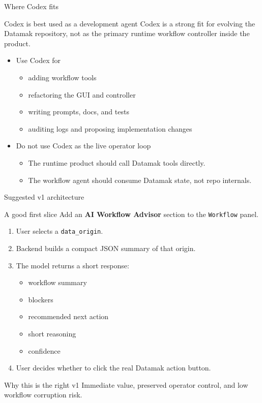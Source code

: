 \documentclass[aspectratio=169,11pt]{beamer}
\newcommand{\code}[1]{\texttt{#1}}
\newcommand{\good}[1]{\textcolor{ppplGreen}{#1}}
\newcommand{\warn}[1]{\textcolor{ppplOrange}{#1}}
\begin{document}
\begin{frame}{Where Codex fits}
  \begin{block}{Codex is best used as a development agent}
    Codex is a strong fit for evolving the Datamak repository, not as the
    primary runtime workflow controller inside the product.
  \end{block}

  \begin{itemize}
    \item \good{Use Codex for}
    \begin{itemize}
      \item adding workflow tools
      \item refactoring the GUI and controller
      \item writing prompts, docs, and tests
      \item auditing logs and proposing implementation changes
    \end{itemize}
    \item \warn{Do not use Codex as the live operator loop}
    \begin{itemize}
      \item The runtime product should call Datamak tools directly.
      \item The workflow agent should consume Datamak state, not repo internals.
    \end{itemize}
  \end{itemize}
\end{frame}

\begin{frame}{Suggested v1 architecture}
  \begin{block}{A good first slice}
    Add an \textbf{AI Workflow Advisor} section to the \code{Workflow} panel.
  \end{block}

  \begin{enumerate}\footnotesize
    \item User selects a \code{data\_origin}.
    \item Backend builds a compact JSON summary of that origin.
    \item The model returns a short response:
    \begin{itemize}\itemsep2pt
      \item workflow summary
      \item blockers
      \item recommended next action
      \item short reasoning
      \item confidence
    \end{itemize}
    \item User decides whether to click the real Datamak action button.
  \end{enumerate}

  \begin{alertblock}{Why this is the right v1}
    Immediate value, preserved operator control, and low workflow corruption risk.
  \end{alertblock}
\end{frame}
\end{document}
